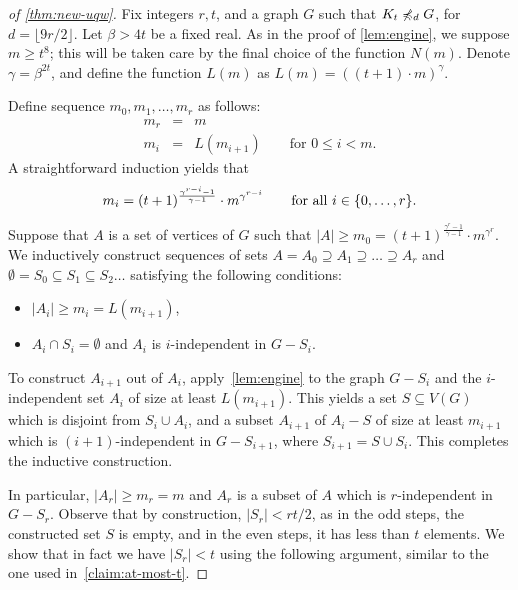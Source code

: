 \begin{proof}[of \cref{thm:new-uqw}]
Fix integers $r,t$,  and a graph $G$ such that $K_t\not\preccurlyeq_{d} G$,
for $d=\lfloor 9r/2 \rfloor$. Let $\beta>4t$ be a fixed real. As in the proof of \cref{lem:engine}, we suppose $m\geq t^8$; this will be taken care by the final choice of the function $N(m)$.
Denote $\gamma=\beta^{2t}$, and
define the function $L(m)$ as $L(m)=((t+1)\cdot m)^\gamma$.

Define sequence $m_0,m_1,\ldots,m_r$ as follows:
\begin{eqnarray*}
m_r & = & m\\
m_i & = & L(m_{i+1}) \qquad \textrm{for }0\leq i<m.
\end{eqnarray*}
A straightforward induction yields that 
\begin{equation*}
m_i=(t+1)^{\frac{\gamma^{r-i}-1}{\gamma-1}}\cdot m^{\gamma^{r-i}}\qquad \textrm{for all }i\in \{0,\ldots,r\}.
\end{equation*}

Suppose that $A$ is a set of vertices of $G$ such that $|A|\ge m_0=(t+1)^{\frac{\gamma^{r}-1}{\gamma-1}}\cdot m^{\gamma^{r}}$. 
We inductively construct sequences of sets $A= A_0\supseteq A_1\supseteq \ldots \supseteq A_r$ and $\emptyset=S_0\subseteq S_1\subseteq S_2\ldots$
satisfying the following conditions:
\begin{itemize}
	\item $|A_i|\ge m_i=L(m_{i+1})$,
	\item $A_i\cap S_i=\emptyset$ and $A_i$ is $i$-independent in $G-S_i$.
\end{itemize}
To construct $A_{i+1}$ out of $A_i$, apply~\cref{lem:engine} to the graph $G-S_i$ and 
the $i$-independent set $A_i$ of size at least $L(m_{i+1})$. This yields a set $S\subseteq V(G)$ which is disjoint from $S_i\cup A_i$, and a subset $A_{i+1}$ of $A_i-S$ of size 
at least $m_{i+1}$
which is $(i+1)$-independent in $G-S_{i+1}$, where $S_{i+1}=S\cup S_i$. This completes the inductive construction.

In particular,  $|A_r|\ge m_r=m$ and $A_r$ is a subset of $A$ which is $r$-independent in $G-S_r$.
Observe that by construction, $|S_r|<r t/2$, as in the odd steps, the constructed set $S$ is empty, and in the even steps, it has less than $t$ elements. 
We show that in fact we have $|S_r|<t$ using the following argument, similar to the one used in~\cref{claim:at-most-t}.


\end{proof}
